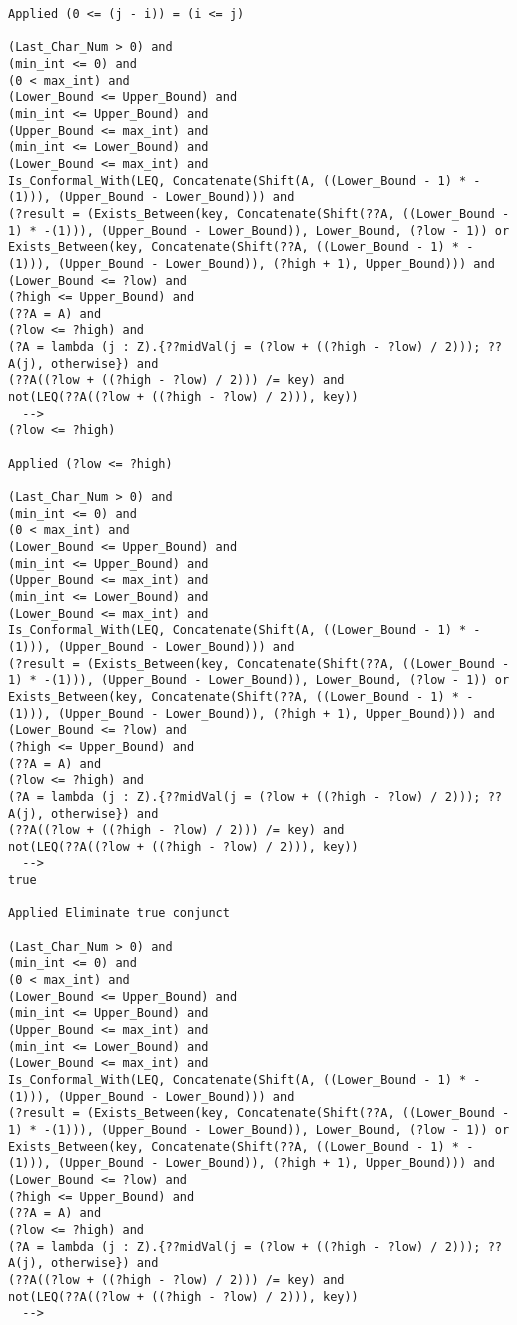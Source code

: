 \begin{lstlisting}[language=resolve]
Applied (0 <= (j - i)) = (i <= j)

(Last_Char_Num > 0) and
(min_int <= 0) and
(0 < max_int) and
(Lower_Bound <= Upper_Bound) and
(min_int <= Upper_Bound) and
(Upper_Bound <= max_int) and
(min_int <= Lower_Bound) and
(Lower_Bound <= max_int) and
Is_Conformal_With(LEQ, Concatenate(Shift(A, ((Lower_Bound - 1) * -(1))), (Upper_Bound - Lower_Bound))) and
(?result = (Exists_Between(key, Concatenate(Shift(??A, ((Lower_Bound - 1) * -(1))), (Upper_Bound - Lower_Bound)), Lower_Bound, (?low - 1)) or Exists_Between(key, Concatenate(Shift(??A, ((Lower_Bound - 1) * -(1))), (Upper_Bound - Lower_Bound)), (?high + 1), Upper_Bound))) and
(Lower_Bound <= ?low) and
(?high <= Upper_Bound) and
(??A = A) and
(?low <= ?high) and
(?A = lambda (j : Z).{??midVal(j = (?low + ((?high - ?low) / 2))); ??A(j), otherwise}) and
(??A((?low + ((?high - ?low) / 2))) /= key) and
not(LEQ(??A((?low + ((?high - ?low) / 2))), key))
  -->
(?low <= ?high)

Applied (?low <= ?high)

(Last_Char_Num > 0) and
(min_int <= 0) and
(0 < max_int) and
(Lower_Bound <= Upper_Bound) and
(min_int <= Upper_Bound) and
(Upper_Bound <= max_int) and
(min_int <= Lower_Bound) and
(Lower_Bound <= max_int) and
Is_Conformal_With(LEQ, Concatenate(Shift(A, ((Lower_Bound - 1) * -(1))), (Upper_Bound - Lower_Bound))) and
(?result = (Exists_Between(key, Concatenate(Shift(??A, ((Lower_Bound - 1) * -(1))), (Upper_Bound - Lower_Bound)), Lower_Bound, (?low - 1)) or Exists_Between(key, Concatenate(Shift(??A, ((Lower_Bound - 1) * -(1))), (Upper_Bound - Lower_Bound)), (?high + 1), Upper_Bound))) and
(Lower_Bound <= ?low) and
(?high <= Upper_Bound) and
(??A = A) and
(?low <= ?high) and
(?A = lambda (j : Z).{??midVal(j = (?low + ((?high - ?low) / 2))); ??A(j), otherwise}) and
(??A((?low + ((?high - ?low) / 2))) /= key) and
not(LEQ(??A((?low + ((?high - ?low) / 2))), key))
  -->
true

Applied Eliminate true conjunct

(Last_Char_Num > 0) and
(min_int <= 0) and
(0 < max_int) and
(Lower_Bound <= Upper_Bound) and
(min_int <= Upper_Bound) and
(Upper_Bound <= max_int) and
(min_int <= Lower_Bound) and
(Lower_Bound <= max_int) and
Is_Conformal_With(LEQ, Concatenate(Shift(A, ((Lower_Bound - 1) * -(1))), (Upper_Bound - Lower_Bound))) and
(?result = (Exists_Between(key, Concatenate(Shift(??A, ((Lower_Bound - 1) * -(1))), (Upper_Bound - Lower_Bound)), Lower_Bound, (?low - 1)) or Exists_Between(key, Concatenate(Shift(??A, ((Lower_Bound - 1) * -(1))), (Upper_Bound - Lower_Bound)), (?high + 1), Upper_Bound))) and
(Lower_Bound <= ?low) and
(?high <= Upper_Bound) and
(??A = A) and
(?low <= ?high) and
(?A = lambda (j : Z).{??midVal(j = (?low + ((?high - ?low) / 2))); ??A(j), otherwise}) and
(??A((?low + ((?high - ?low) / 2))) /= key) and
not(LEQ(??A((?low + ((?high - ?low) / 2))), key))
  -->



\end{lstlisting}
